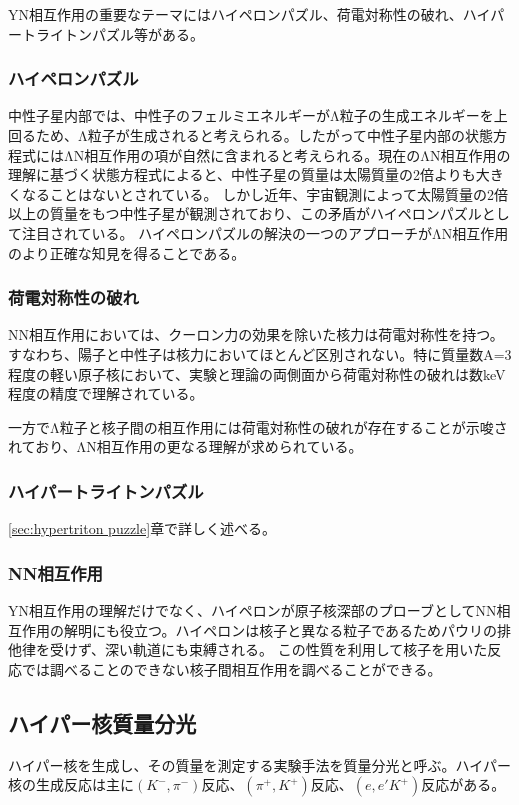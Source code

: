 \documentclass[a4paper,11pt,uplatex]{jsbook}
\begin{document}
YN相互作用の重要なテーマにはハイペロンパズル、荷電対称性の破れ、ハイパートライトンパズル等がある。
\subsubsection{ハイペロンパズル}
中性子星内部では、中性子のフェルミエネルギーがΛ粒子の生成エネルギーを上回るため、Λ粒子が生成されると考えられる。したがって中性子星内部の状態方程式にはΛN相互作用の項が自然に含まれると考えられる。現在のΛN相互作用の理解に基づく状態方程式によると、中性子星の質量は太陽質量の2倍よりも大きくなることはないとされている。
しかし近年、宇宙観測によって太陽質量の2倍以上の質量をもつ中性子星が観測されており、この矛盾がハイペロンパズルとして注目されている。
ハイペロンパズルの解決の一つのアプローチがΛN相互作用のより正確な知見を得ることである。
\subsubsection{荷電対称性の破れ}
NN相互作用においては、クーロン力の効果を除いた核力は荷電対称性を持つ。すなわち、陽子と中性子は核力においてほとんど区別されない。特に質量数A=3程度の軽い原子核において、実験と理論の両側面から荷電対称性の破れは数keV程度の精度で理解されている。

一方でΛ粒子と核子間の相互作用には荷電対称性の破れが存在することが示唆されており、ΛN相互作用の更なる理解が求められている。
\subsubsection{ハイパートライトンパズル}
\ref{sec:hypertriton puzzle}章で詳しく述べる。
\subsubsection{NN相互作用}

YN相互作用の理解だけでなく、ハイペロンが原子核深部のプローブとしてNN相互作用の解明にも役立つ。ハイペロンは核子と異なる粒子であるためパウリの排他律を受けず、深い軌道にも束縛される。
この性質を利用して核子を用いた反応では調べることのできない核子間相互作用を調べることができる。
\subsection{ハイパー核質量分光}
ハイパー核を生成し、その質量を測定する実験手法を質量分光と呼ぶ。ハイパー核の生成反応は主に$(K^-, \pi^-)$反応、$(\pi^+, K^+)$反応、$(e,e'K^+)$反応がある。
\end{document}
